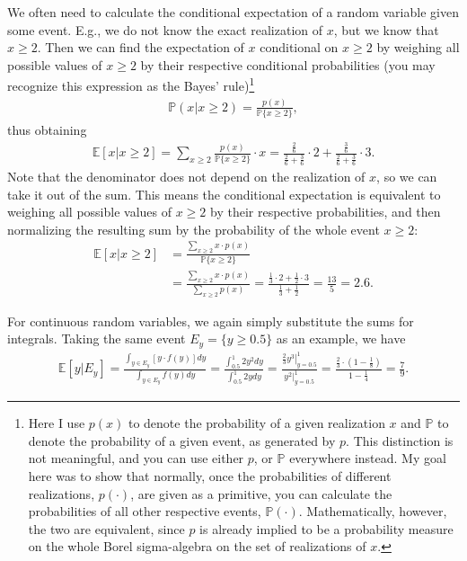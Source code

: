 \documentclass{article}
\begin{document}
We often need to calculate the conditional expectation of a random variable given some event. E.g., we do not know the exact realization of $x$, but we know that $x \geq 2$. Then we can find the expectation of $x$ conditional on $x \geq 2$ by weighing all possible values of $x \geq 2$ by their respective conditional probabilities (you may recognize this expression as the Bayes' rule)\footnote{
	Here I use $p(x)$ to denote the probability of a given realization $x$ and $\mathbb{P}$ to denote the probability of a given event, as generated by $p$. This distinction is not meaningful, and you can use either $p$, or $\mathbb{P}$ everywhere instead. My goal here was to show that normally, once the probabilities of different realizations, $p(\cdot)$, are given as a primitive, you can calculate the probabilities of all other respective events, $\mathbb{P}(\cdot)$. Mathematically, however, the two are equivalent, since $p$ is already implied to be a probability measure on the whole Borel sigma-algebra on the set of realizations of $x$.
}
\begin{align*}
	\mathbb{P}(x|x\geq 2) = \frac{p(x)}{\mathbb{P}\{x \geq 2\}},
\end{align*}
thus obtaining
\begin{align*}
	\mathbb{E}[x|x\geq 2] = \sum_{x\geq 2} \frac{p(x)}{\mathbb{P}\{x\geq 2\}} \cdot x
	= \frac{\frac{2}{6}}{\frac{2}{6} + \frac{3}{6}} \cdot 2 + \frac{\frac{3}{6}}{\frac{2}{6} + \frac{3}{6}} \cdot 3.
\end{align*}
Note that the denominator does not depend on the realization of $x$, so we can take it out of the sum. This means the conditional expectation is equivalent to weighing all possible values of $x \geq 2$ by their respective probabilities, and then normalizing the resulting sum by the probability of the whole event $x \geq 2$:
\begin{align*}
	\mathbb{E}[x|x\geq 2] &= \frac{\sum_{x\geq 2} x \cdot p(x)}{\mathbb{P}\{x\geq 2\}} 
	\\
	&= \frac{\sum_{x\geq 2} x \cdot p(x)}{\sum_{x\geq 2} p(x)} = \frac{\frac{1}{3}\cdot 2 + \frac{1}{2} \cdot 3}{\frac{1}{3} + \frac{1}{2}} = \frac{13}{5} = 2.6.
\end{align*}

For continuous random variables, we again simply substitute the sums for integrals. Taking the same event $E_y = \{y \geq 0.5\}$ as an example, we have
\begin{align*}
	\mathbb{E}[y|E_y] 
	= \frac{\int_{y \in E_y} \left[y \cdot f(y)\right] dy}{\int_{y \in E_y} f(y) dy} 
	= \frac{\int_{0.5}^1 2y^2 dy}{\int_{0.5}^1 2y dy} 
	= \frac{\left.\frac{2}{3} y^3\right|_{y=0.5}^1}{y^2|_{y=0.5}^1} 
	= \frac{\frac{2}{3}\cdot \left(1-\frac{1}{8}\right)}{1-\frac{1}{4}}
	= \frac{7}{9}.
\end{align*}
\end{document}
